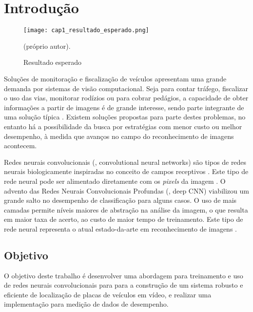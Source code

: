 
\chapter{Introdução}

\begin{figure}[!htb]
	\centering
	\texttt{[image: cap1\_resultado\_esperado.png]}
	\caption{Resultado esperado}
	\label{fig:cap1_resultado_esperado}
	(próprio autor).
\end{figure}

Soluções de monitoração e fiscalização de veículos apresentam
uma grande demanda por sistemas de visão computacional. Seja
para contar tráfego, fiscalizar o uso das vias, monitorar
rodízios ou para cobrar pedágios, a capacidade de obter
informações a partir de imagens é de grande interesse, sendo parte integrante
de uma solução típica \cite{anagnostopoulos2008license}.  Existem
soluções propostas para parte destes problemas, no entanto há a
possibilidade da busca por estratégias com menor custo ou melhor
desempenho, à medida que avanços no campo do reconhecimento de
imagens acontecem.

Redes neurais convolucionais (, convolutional neural networks)
são tipos de redes neurais biologicamente inspiradas no conceito
de campos receptivos \cite{hubel1968receptive}. Este tipo de
rede neural pode ser alimentado
diretamente com os \emph{pixels} da imagem \cite{lecun1998gradient}. O
advento das Redes Neurais Convolucionais Profundas (, deep CNN)
viabilizou um grande salto no desempenho de classificação para alguns casos.
O uso de mais camadas permite níveis maiores de
abstração na análise da imagem, o que resulta em maior taxa de
acerto, ao custo de maior tempo de treinamento. Este tipo de rede
neural representa o atual estado-da-arte em reconhecimento de
imagens \cite{szegedy2015going}.

\section{Objetivo}
O objetivo deste trabalho é desenvolver uma abordagem para
treinamento e uso de redes neurais convolucionais para para a
construção de um sistema robusto e eficiente de localização de
placas de veículos em vídeo, e realizar uma implementação para
medição de dados de desempenho.

